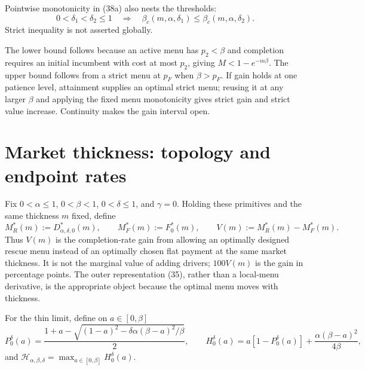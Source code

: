 \documentclass[mnsc,blindrev]{informs3}
\begin{document}
Pointwise monotonicity in (38a) also nests the thresholds:
\[
 0<\delta_1<\delta_2\le1
 \quad\Longrightarrow\quad
 \beta_c(m,\alpha,\delta_1)
 \le\beta_c(m,\alpha,\delta_2).                            \tag{42a}
\]
Strict inequality is not asserted globally.

The lower bound follows because an active menu has $p_2<\beta$ and completion
requires an initial incumbent with cost at most $p_2$, giving
$M<1-e^{-m\beta}$.  The upper bound follows from a strict menu at $p_F$ when
$\beta>p_F$.  If gain holds at one patience level, attainment supplies an
optimal strict menu; reusing it at any larger $\beta$ and applying the fixed
menu monotonicity gives strict gain and strict value increase.  Continuity
makes the gain interval open.

\section{Market thickness: topology and endpoint rates}
\label{sec:thickness}

Fix $0<\alpha\le1$, $0<\beta<1$, $0<\delta\le1$, and $\gamma=0$.  Holding
these primitives and the same thickness $m$ fixed, define
\[
 M_R^*(m):=D_{\alpha,\delta,0}^*(m),\qquad
 M_F^*(m):=F_0^*(m),\qquad
 V(m):=M_R^*(m)-M_F^*(m).                                 \tag{43}
\]
Thus $V(m)$ is the completion-rate gain from allowing an optimally designed
rescue menu instead of an optimally chosen flat payment at the same market
thickness.  It is not the marginal value of adding drivers; $100V(m)$ is the
gain in percentage points.
The outer representation (35), rather than a local-menu derivative, is the
appropriate object because the optimal menu moves with thickness.

For the thin limit, define on $a\in[0,\beta]$
\[
 P_0^\delta(a)=
 \frac{1+a-\sqrt{(1-a)^2-
 \delta\alpha(\beta-a)^2/\beta}}2,
 \qquad
 H_0^\delta(a)=a[1-P_0^\delta(a)]
 +\frac{\alpha(\beta-a)^2}{4\beta},                       \tag{44}
\]
and $\mathcal H_{\alpha,\beta,\delta}=\max_{a\in[0,\beta]}H_0^\delta(a)$.
\end{document}
